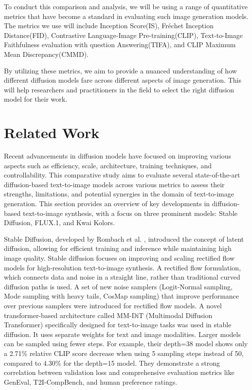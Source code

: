 \documentclass{article}
\begin{document}
To conduct this comparison and analysis, we will be using a range of quantitative metrics that have become a standard 
in evaluating such image generation models. The metrics we use will include Inception Score(IS), Fréchet Inception Distance(FID),
Contrastive Language-Image Pre-training(CLIP), Text-to-Image Faithfulness evaluation with question Answering(TIFA), and 
CLIP Maximum Mean Discrepancy(CMMD). 

By utilizing these metrics, we aim to provide a nuanced understanding of how different diffusion models fare across different aspects
of image generation. This will help researchers and practitioners in the field to select the right diffusion model for their work. 



\section{Related Work}
Recent advancements in diffusion models have focused on improving various aspects such as efficiency, scale, 
architecture, training techniques, and controllability. This comparative study aims to evaluate several state-of-the-art 
diffusion-based text-to-image models across various metrics to assess their strengths, limitations, and potential synergies in the 
domain of text-to-image generation. This section provides an overview of key developments in diffusion-based text-to-image synthesis, 
with a focus on three prominent models: Stable Diffusion, FLUX.1, and Kwai Kolors.

Stable Diffusion, developed by Rombach et al. \cite{ulal2024stablediffusion}, introduced the concept of latent diffusion, allowing for efficient training 
and inference while maintaining high image quality. Stable diffusion focuses on improving and 
scaling rectified  flow models for high-resolution text-to-image synthesis. A rectified flow formulation, which connects 
data and noise in a straight 
line, rather than traditional curved diffusion paths is used. A set of new noise samplers (Logit-Normal sampling, Mode sampling 
with heavy tails, CosMap sampling) that improve performance over previous samplers were introduced for rectified flow models. 
A novel transformer-based architecture called MM-DiT (Multimodal Diffusion Transformer) specifically designed for text-to-image 
tasks was used in stable diffusion. It uses separate weights for text and image modalities. Larger models can be sampled using fewer 
steps. For example, their depth=38 model shows only a 2.71\% relative CLIP score decrease when using 5 sampling steps instead of 50, 
compared to 4.30\% for the depth=15 model. They demonstrate a strong correlation between validation loss and comprehensive 
evaluation metrics like GenEval, T2I-CompBench, and human preference ratings.
\end{document}
